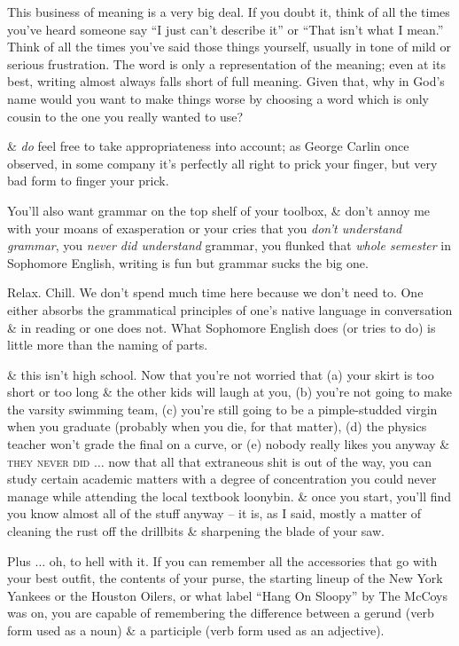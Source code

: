 \documentclass{article}
\numberwithin{equation}{section}
\begin{document}
This business of meaning is a very big deal. If you doubt it, think of all the times you've heard someone say ``I just can't describe it'' or ``That isn't what I mean.'' Think of all the times you've said those things yourself, usually in tone of mild or serious frustration. The word is only a representation of the meaning; even at its best, writing almost always falls short of full meaning. Given that, why in God's name would you want to make things worse by choosing a word which is only cousin to the one you really wanted to use?

\& \textit{do} feel free to take appropriateness into account; as George Carlin once observed, in some company it's perfectly all right to prick your finger, but very bad form to finger your prick.

 You'll also want grammar on the top shelf of your toolbox, \& don't annoy me with your moans of exasperation or your cries that you \textit{don't understand grammar}, you \textit{never did understand} grammar, you flunked that \textit{whole semester} in Sophomore English, writing is fun but grammar sucks the big one.

Relax. Chill. We don't spend much time here because we don't need to. One either absorbs the grammatical principles of one's native language in conversation \& in reading or one does not. What Sophomore English does (or tries to do) is little more than the naming of parts.

\& this isn't high school. Now that you're not worried that (a) your skirt is too short or too long \& the other kids will laugh at you, (b) you're not going to make the varsity swimming team, (c) you're still going to be a pimple-studded virgin when you graduate (probably when you die, for that matter), (d) the physics teacher won't grade the final on a curve, or (e) nobody really likes you anyway \textsc{\& they never did} $\ldots$ now that all that  extraneous shit is out of the way, you can study certain academic matters with a degree of concentration you could never manage while attending the local textbook loonybin. \& once you start, you'll find you know almost all of the stuff anyway -- it is, as I said, mostly a matter of cleaning the rust off the drillbits \& sharpening the blade of your saw.

Plus $\ldots$ oh, to hell with it. If you can remember all the accessories that go with your best outfit, the contents of your purse, the starting lineup of the New York Yankees or the Houston Oilers, or what label ``Hang On Sloopy'' by The McCoys was on, you are capable of remembering the difference between a gerund (verb form used as a noun) \& a participle (verb form used as an adjective).
\end{document}
